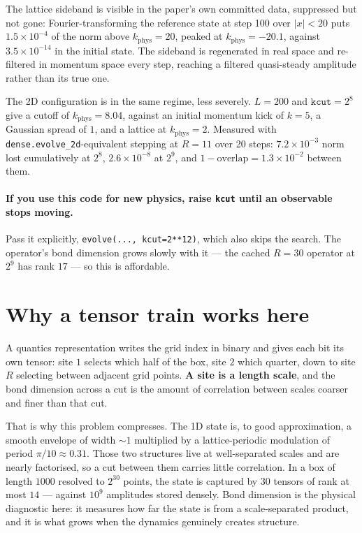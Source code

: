 \documentclass[11pt,a4paper]{article}
\newcommand{\code}[1]{\texttt{#1}}
\newcommand{\kph}{k_{\mathrm{phys}}}
\begin{document}
The lattice sideband is visible in the paper's own committed data, suppressed but not
gone: Fourier-transforming the reference state at step 100 over $|x| < 20$ puts
$1.5\times10^{-4}$ of the norm above $\kph = 20$, peaked at $\kph = -20.1$, against
$3.5\times10^{-14}$ in the initial state. The sideband is regenerated in real space
and re-filtered in momentum space every step, reaching a filtered quasi-steady
amplitude rather than its true one.

The 2D configuration is in the same regime, less severely. $L = 200$ and
$\code{kcut} = 2^8$ give a cutoff of $\kph = 8.04$, against an initial momentum kick
of $k = 5$, a Gaussian spread of $1$, and a lattice at $\kph = 2$. Measured with
\code{dense.evolve\_2d}-equivalent stepping at $R = 11$ over 20 steps:
$7.2\times10^{-3}$ norm lost cumulatively at $2^8$, $2.6\times10^{-8}$ at $2^9$, and
$1 - \text{overlap} = 1.3\times10^{-2}$ between them.

\paragraph{If you use this code for new physics, raise \code{kcut} until an
observable stops moving.}
Pass it explicitly, \code{evolve(..., kcut=2**12)}, which also skips the search. The
operator's bond dimension grows slowly with it --- the cached $R = 30$ operator at
$2^9$ has rank $17$ --- so this is affordable.

\section{Why a tensor train works here}

A quantics representation writes the grid index in binary and gives each bit its own
tensor: site $1$ selects which half of the box, site $2$ which quarter, down to site
$R$ selecting between adjacent grid points. \textbf{A site is a length scale}, and the
bond dimension across a cut is the amount of correlation between scales coarser and
finer than that cut.

That is why this problem compresses. The 1D state is, to good approximation, a smooth
envelope of width ${\sim}1$ multiplied by a lattice-periodic modulation of period
$\pi/10 \approx 0.31$. Those two structures live at well-separated scales and are
nearly factorised, so a cut between them carries little correlation. In a box of
length $1000$ resolved to $2^{30}$ points, the state is captured by $30$ tensors of
rank at most $14$ --- against $10^9$ amplitudes stored densely. Bond dimension is the
physical diagnostic here: it measures how far the state is from a scale-separated
product, and it is what grows when the dynamics genuinely creates structure.
\end{document}
